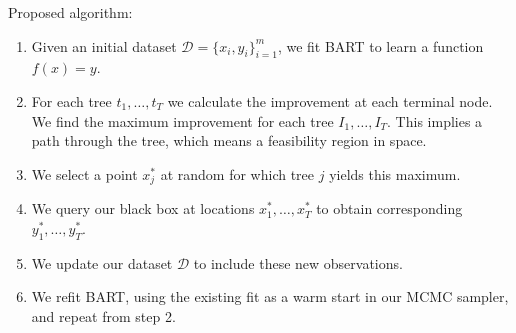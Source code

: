 \documentclass[12pt]{article}
\begin{document}
Proposed algorithm:

\begin{enumerate}
\item Given an initial dataset $\mathcal{D} = \{x_i,y_i\}_{i=1}^m$, we fit BART to learn a function $f(x) = y$.
\item For each tree $t_1, \ldots, t_T$ we calculate the improvement at each terminal node. We find the maximum improvement 
for each tree $I_1, \ldots, I_T$. This implies a path through the tree, which means a feasibility region in space.
\item We select a point $x_j^*$ at random for which tree $j$ yields this maximum. 
\item We query our black box at locations $x_1^*, \ldots, x_T^*$ to obtain corresponding $y_1^*, \ldots, y_T^*$.
\item We update our dataset $\mathcal{D}$ to include these new observations.
\item We refit BART, using the existing fit as a warm start in our MCMC sampler, and repeat from step 2.
\end{enumerate}
\end{document}
